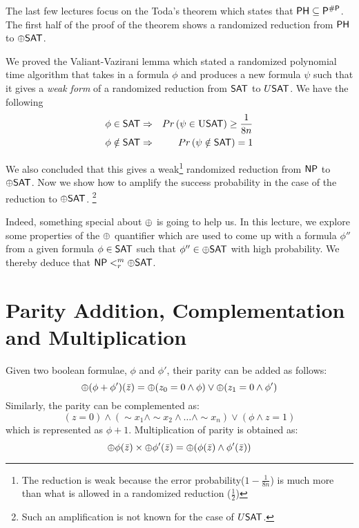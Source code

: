 \documentclass[11pt]{article}
\begin{document}
	

The last few lectures focus on the Toda's theorem which states
that ${\mathsf{PH}} \subseteq {\ensuremath{\mathsf{P}}}^{\#{\mathsf{P}}}$. The first half of the proof of the theorem
shows a randomized reduction from ${\mathsf{PH}}$ to $\oplus {\ensuremath{\mathsf{SAT}}}$. 

We proved the Valiant-Vazirani lemma which stated a randomized polynomial time algorithm that takes in a formula $\phi$ and produces a new formula $\psi$ such that it gives a {\em weak form} of a randomized reduction from ${\mathsf{SAT}}$ to $U{\mathsf{SAT}}$.  We have the following 
\begin{eqnarray*}
\phi \in {\ensuremath{\mathsf{SAT}}} & \Rightarrow & Pr \left( \psi \in \textrm{\sc U{\ensuremath{\mathsf{SAT}}}} \right) \ge \frac{1}{8n} \\
\phi \notin {\ensuremath{\mathsf{SAT}}} & \Rightarrow & Pr \left( \psi \notin {\ensuremath{\mathsf{SAT}}} \right) = 1
\end{eqnarray*}

We also concluded that this gives a weak\footnote{The reduction is weak because the error probability($1-\frac{1}{8n}$) is much more than what is allowed in a randomized reduction ($\frac{1}{2}$)} randomized reduction from ${\mathsf{NP}}$ to $\oplus{\ensuremath{\mathsf{SAT}}}$.  Now we show how to amplify the success probability in the case of the reduction to $\oplus {\ensuremath{\mathsf{SAT}}}$. \footnote{Such an amplification is not known for the case of $U{\mathsf{SAT}}$.}

Indeed, something special about $\oplus$ is going to help us. In this lecture, we explore some properties of the $\oplus$ quantifier which are used to come up with a formula $\phi''$ from a given formula $\phi \in {\ensuremath{\mathsf{SAT}}} $ such that $\phi'' \in \oplus {\ensuremath{\mathsf{SAT}}}$ with high probability. We thereby deduce that ${\mathsf{NP}} <^m_r \oplus {\ensuremath{\mathsf{SAT}}}$.

\section{Parity Addition, Complementation and Multiplication}
Given two boolean formulae, $\phi $ and $\phi'$, their parity can be added as follows: 
\[\oplus(\phi + \phi')(\bar z) = \oplus(z_0 = 0 \wedge \phi) \vee \oplus(z_1 = 0 \wedge \phi')  \]
Similarly, the parity can be complemented as: 
\[(z= 0 )\wedge (\sim x_1 \wedge \sim x_2 \wedge \ldots \wedge \sim x_n ) \vee (\phi \wedge z = 1)\]
which is represented as $\phi + 1$.
Multiplication of parity is obtained as: 
\[\oplus \phi(\bar z) \times \oplus \phi'(\bar z) = \oplus (\phi(\bar z) \wedge \phi'(\bar z)) \]
\end{document}
